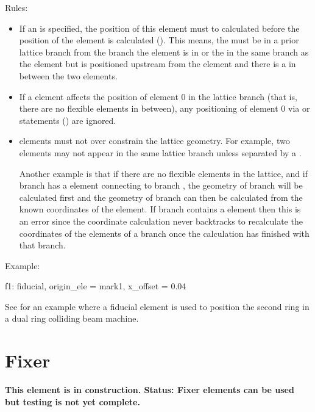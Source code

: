 Rules: 
  \begin{itemize}
  \item
If an  is specified, the position of this element must to calculated before the
position of the  element is calculated (). This means, the 
must be in a prior lattice branch from the branch the  element is in or the
 in the same branch as the  element but is positioned upstream from the
 element and there is a   in between the two elements.
  \item
If a  element affects the position of element 0 in the lattice branch (that is, there
are no flexible  elements in between), any positioning of element 0 via  or
 statements () are ignored.
  \item
{} elements must not over constrain the lattice geometry.  For example, two 
elements may not appear in the same lattice branch unless separated by a  .

Another example is that if there are no flexible  elements in the lattice, and if branch
 has a  element connecting to branch , the geometry of branch  will be
calculated first and the geometry of branch  can then be calculated from the known coordinates
of the  element. If branch  contains a  element then this is an error
since the coordinate calculation never backtracks to recalculate the coordinates of the elements of
a branch once the calculation has finished with that branch.
  \end{itemize}

Example:
\begin{example}
  f1: fiducial, origin_ele = mark1, x_offset = 0.04
\end{example}
See  for an example where a fiducial element is
used to position the second ring in a dual ring colliding beam 
machine.

\newpage

\section{Fixer}
\label{s:fixer}

{\bf This element is in construction. Status: Fixer elements can be used but testing is not yet complete.}

